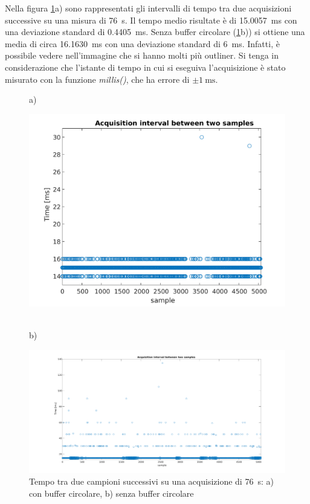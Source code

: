 Nella figura \ref{fig:time_interval}a) sono rappresentati gli intervalli di tempo tra due acquisizioni successive su una misura di \SI{76}{\second}. Il tempo medio risultate è di \SI{15.0057}{\milli\second} con una deviazione standard di \SI{0.4405}{\milli\second}. Senza buffer circolare (\Fig\ref{fig:time_interval}b)) si ottiene una media di circa \SI{16.1630}{\milli\second} con una deviazione standard di \SI{6}{\milli\second}. Infatti, è possibile vedere nell'immagine che si hanno molti più outliner.
Si tenga in considerazione che l'istante di tempo in cui si eseguiva l'acquisizione è stato misurato con la funzione \textit{millis()}, che ha errore di $\pm \SI{1}{\milli\second}$. 
\begin{figure}[tbh]
	\centering
	a)
	\begin{minipage}{.900\textwidth}
		\includegraphics[width=0.8\linewidth]{./ImageFiles/interval_time.pdf}
	\end{minipage}
	\\b)
	\begin{minipage}{.900\textwidth}
		\includegraphics[width=\linewidth]{./ImageFiles/interval_time_2}
	\end{minipage}
	\caption{Tempo tra due campioni successivi su una acquisizione di \SI{76}{\second}: a) con buffer circolare, b) senza buffer circolare}
	\label{fig:time_interval}
\end{figure}

